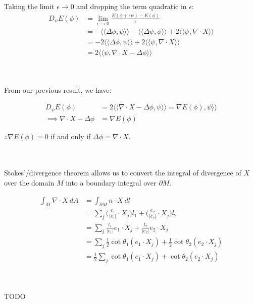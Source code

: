 \documentclass{article}
\newcommand\ifrac[2]{{\displaystyle\frac{#1}{#2}}}
\def\grad{\nabla}
\def\lap{\Delta}
\def\hal{\ifrac{1}{2}}
\def\ll{\langle\langle}
\def\rr{\rangle\rangle}
\begin{document}
Taking the limit $\epsilon \to 0$ and dropping the term quadratic in $\epsilon$:
\begin{align*}
    D_\psi E(\phi) &= \lim_{\epsilon \to 0} \frac{E(\phi + \epsilon \psi) - E(\phi)}{\epsilon} \\
        &= - \ll \lap \phi, \psi \rr - \ll \lap \psi, \phi \rr + 2 \ll \psi, \grad \cdot X \rr \\
        &= - 2 \ll \lap \phi, \psi \rr + 2 \ll \psi, \grad \cdot X \rr \\
        &= 2 \ll \psi, \grad \cdot X - \lap \phi \rr
\end{align*}


\vspace{1.8cm}
\\\\


From our previous result, we have:

\begin{align*}
    D_\psi E(\phi) &= 2 \ll \grad \cdot X - \lap \phi, \psi \rr = \grad E(\phi), \psi \rr \\
    \implies \grad \cdot X - \lap \phi &= \grad E(\phi)
\end{align*}

$\therefore \grad E(\phi) = 0$ if and only if $\lap \phi = \grad \cdot X$.


\pagebreak
{}\\\\


Stokes'/divergence theorem allows us to convert the integral of divergence of $X$ over the domain $M$
into a boundary integral over $\partial M$.

\begin{align*}
    \int_M \nabla \cdot X \ dA &= \int_{\partial M} n \cdot X \ dl \\
        &= \sum_{j} \Big(\frac{e_1}{| e_1 |} \cdot X_j \Big) l_1 +\Big(\frac{e_2}{| e_2 |} \cdot X_j \Big) l_2 \\
        &= \sum_{j} \frac{l_1}{| e_1 |} e_1 \cdot X_j + \frac{l_2}{| e_2 |} e_2 \cdot X_j \\
        &= \sum_{j} \hal \cot{\theta_1} (e_1 \cdot X_j) + \hal \cot{\theta_2} (e_2 \cdot X_j) \\
        &= \hal \sum_{j} \cot{\theta_1} (e_1 \cdot X_j) + \cot{\theta_2} (e_2 \cdot X_j)
\end{align*}


\vspace{1.8cm}
\\\\
TODO
\end{document}
